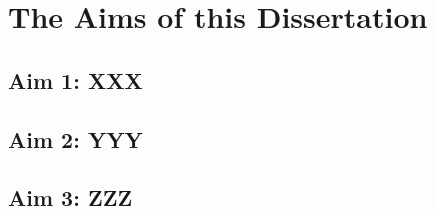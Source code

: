 \chapter{The Aims of this Dissertation}
\label{sec:aims}

\section{Aim 1: XXX}
\label{sec:aim1}


\section{Aim 2: YYY}
\label{sec:aim2}


\section{Aim 3: ZZZ}
\label{sec:aim3}

